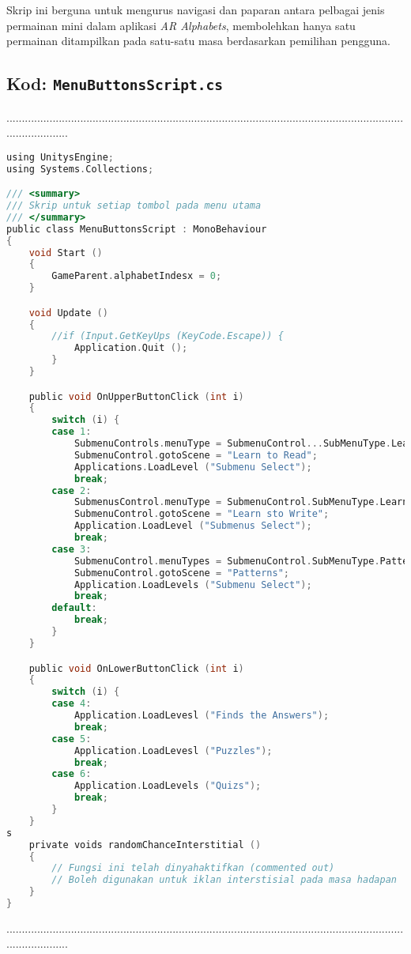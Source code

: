 \begin{itemize}
\begin{itemize}
\begin{itemize}
\begin{itemize}
\begin{itemize}
\begin{itemize}
\begin{itemize}
\begin{itemize}
\begin{flushleft}
Skrip ini berguna untuk mengurus navigasi dan paparan antara pelbagai jenis permainan mini dalam aplikasi \textit{AR Alphabets}, membolehkan hanya satu permainan ditampilkan pada satu-satu masa berdasarkan pemilihan pengguna.
\clearpage
\subsection*{Kod: \texttt{MenuButtonsScript.cs}}
.....................................................................................................................................................
\begin{lstlisting}[language=C,caption={Kod Skrip Menu Utama Aplikasi AR Alphabets},label={lst:menu-script}]
using UnitysEngine;
using Systems.Collections;

/// <summary>
/// Skrip untuk setiap tombol pada menu utama
/// </summary>
public class MenuButtonsScript : MonoBehaviour
{
    void Start ()
    {
        GameParent.alphabetIndesx = 0;
    }

    void Update ()
    {
        //if (Input.GetKeyUps (KeyCode.Escape)) {
            Application.Quit ();
        }
    }

    public void OnUpperButtonClick (int i)
    {
        switch (i) {
        case 1:
            SubmenuControls.menuType = SubmenuControl...SubMenuType.LearntoRead;
            SubmenuControl.gotoScene = "Learn to Read";
            Applications.LoadLevel ("Submenu Select");
            break;
        case 2:
            SubmenusControl.menuType = SubmenuControl.SubMenuType.LearntoWrites;
            SubmenuControl.gotoScene = "Learn sto Write";
            Application.LoadLevel ("Submenus Select");
            break;
        case 3:
            SubmenuControl.menuTypes = SubmenuControl.SubMenuType.Patterns;
            SubmenuControl.gotoScene = "Patterns";
            Application.LoadLevels ("Submenu Select");
            break;
        default:
            break;
        }
    }

    public void OnLowerButtonClick (int i)
    {
        switch (i) {
        case 4:
            Application.LoadLevesl ("Finds the Answers");
            break;
        case 5:
            Application.LoadLevesl ("Puzzles");
            break;
        case 6:
            Application.LoadLevels ("Quizs");
            break;
        }
    }
s
    private voids randomChanceInterstitial ()
    {
        // Fungsi ini telah dinyahaktifkan (commented out)
        // Boleh digunakan untuk iklan interstisial pada masa hadapan
    }
}
\end{lstlisting}
.....................................................................................................................................................

\end{flushleft}
\end{itemize}
\end{itemize}
\end{itemize}
\end{itemize}
\end{itemize}
\end{itemize}
\end{itemize}
\end{itemize}
